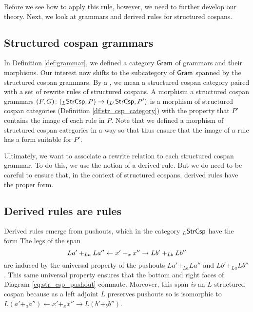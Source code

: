 \documentclass{amsart}
\begin{document}
Before we see how to apply this rule, however, we
need to further develop our theory. Next, we look
at grammars and derived rules for structured cospans.



\subsection{Structured cospan grammars}
\label{sec:struct-cosp-gramm}

In Definition \ref{def:grammar}, we defined a
category $ \mathsf{Gram} $ of grammars and their
morphisms.  Our interest now shifts to the
subcategory of $ \mathsf{Gram} $ spanned by the structured
cospan grammars. By a , we mean a structured cospan category
paired with a set of rewrite rules of structured
cospans.  A morphism a structured cospan grammars
$ (F,G) \colon ( _L\mathsf{StrCsp},P ) \to (_{L'}\mathsf{StrCsp},
P') $ is a morphism of structured cospan
categories (Definition \ref{df:str_csp_category})
with the property that $ P' $ contains the image
of each rule in $ P $. Note that we defined a
morphism of structured cospan categories in a way
so that 
thus ensure that the image of a rule has a form
suitable for $ P' $.

Ultimately, we want to associate a rewrite
relation to each structured cospan grammar. To do
this, we use the notion of a derived rule. But we
do need to be careful to ensure that, in the
context of structured cospans, derived rules have the
proper form.


\subsection{Derived rules are rules}
\label{sec:derived-rules-are}

Derived rules emerge from pushouts, which in the
category $_L\mathsf{StrCsp}$ have the form
 The legs of the
span
$$La'+_{La}La'' \leftarrow x'+_xx'' \to Lb'+_{Lb}Lb''$$
are induced by the universal property of the
pushouts $La'+_{La}La''$ and $Lb'+_{La}Lb''$. This
same universal property ensures that the bottom
and right faces of Diagram
\eqref{eq:str_csp_pushout} commute. Moreover, this
span \emph{is} an $L$-structured cospan because as
a left adjoint $L$ preserves pushouts so is
isomorphic to
$ L(a'+_aa'') \gets x'+_xx'' \to L(b'+_bb'') $.
\end{document}

